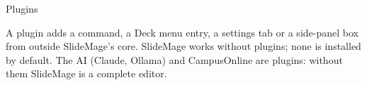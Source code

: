 
\begin{sectionframe}{Plugins}
	\begin{minipage}[t]{0.9\linewidth}\small
		A plugin adds a command, a Deck menu entry, a settings tab or a
		side-panel box from outside SlideMage's core. SlideMage works without
		plugins; none is installed by default. The AI (Claude, Ollama) and
		CampusOnline are plugins: without them SlideMage is a complete editor.
	\end{minipage}\par\medskip
	\SMChapterAgenda
\end{sectionframe}
